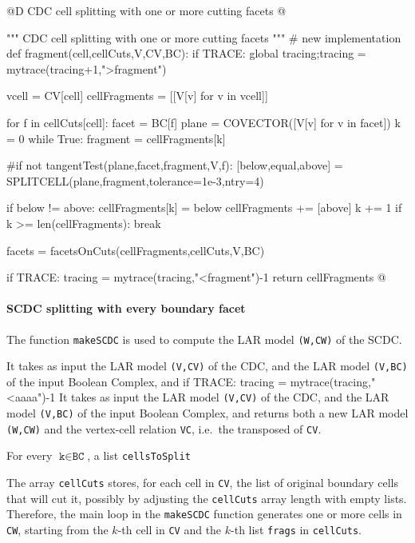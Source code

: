 \documentclass[11pt,oneside]{article}	%
\begin{document}
@D CDC cell splitting with one or more cutting facets
@{""" CDC cell splitting with one or more cutting facets """
# new implementation
def fragment(cell,cellCuts,V,CV,BC):
	if TRACE: global tracing;tracing = mytrace(tracing+1,">fragment")

	vcell = CV[cell]
	cellFragments = [[V[v] for v in vcell]]
	
	for f in cellCuts[cell]:
		facet = BC[f]
		plane = COVECTOR([V[v] for v in facet])
		k = 0
		while True:
			fragment = cellFragments[k]
		
			#if not tangentTest(plane,facet,fragment,V,f):
			[below,equal,above] = SPLITCELL(plane,fragment,tolerance=1e-3,ntry=4)

			if below != above:
				cellFragments[k] = below
				cellFragments += [above]
			k += 1
			if k >= len(cellFragments): break
				
		facets = facetsOnCuts(cellFragments,cellCuts,V,BC)

	if TRACE: tracing = mytrace(tracing,"<fragment")-1
	return cellFragments
@}

\paragraph{SCDC splitting with every boundary facet}
The function \texttt{makeSCDC} is used  to compute the LAR model \texttt{(W,CW)} of the SCDC.

It takes as input the LAR model \texttt{(V,CV)} of the CDC, and the LAR model \texttt{(V,BC)} of the input Boolean Complex, and if TRACE: tracing = mytrace(tracing,"<aaaa")-1
It takes as input the LAR model \texttt{(V,CV)} of the CDC, and the LAR model \texttt{(V,BC)} of the input Boolean Complex, and returns both a new LAR model \texttt{(W,CW)} and the vertex-cell relation \texttt{VC}, i.e.~the transposed of \texttt{CV}.

For every $\texttt{k} \in \texttt{BC}$, a list \texttt{cellsToSplit}

The array \texttt{cellCuts}  stores, for each cell in \texttt{CV}, the list of original boundary cells that will cut it, possibly by adjusting the \texttt{cellCuts} array length with empty lists.
Therefore, the main loop in the \texttt{makeSCDC} function generates one or more cells in \texttt{CW}, starting from the $k$-th cell in \texttt{CV} and the $k$-th list \texttt{frags} in \texttt{cellCuts}.
\end{document}
